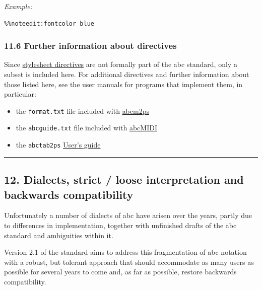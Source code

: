 \documentclass[oneside]{book}
\begin{document}
\emph{Example:}

\begin{verbatim}
%%noteedit:fontcolor blue
\end{verbatim}

\hypertarget{further_information_about_directives}{\subsubsection{11.6
Further information about
directives}\label{further_information_about_directives}}

Since \protect\hyperlink{stylesheet_directive_definition}{stylesheet
directives} are not formally part of the abc standard, only a subset is
included here. For additional directives and further information about
those listed here, see the user manuals for programs that implement
them, in particular:

\begin{itemize}
\item
  the \texttt{format.txt} file included with
  \href{http://moinejf.free.fr/}{abcm2ps}
\item
  the \texttt{abcguide.txt} file included with
  \href{http://abc.sourceforge.net/abcMIDI/}{abcMIDI}
\item
  the \texttt{abctab2ps}
  \href{http://www.lautengesellschaft.de/cdmm/userguide/userguide.html}{User's
  guide}
\end{itemize}

\begin{center}\rule{0.5\linewidth}{\linethickness}\end{center}

\hypertarget{dialects_strict_loose_interpretation_and_backwards_compatibility}{\subsection{12.
Dialects, strict / loose interpretation and backwards
compatibility}\label{dialects_strict_loose_interpretation_and_backwards_compatibility}}

Unfortunately a number of dialects of abc have arisen over the years,
partly due to differences in implementation, together with unfinished
drafts of the abc standard and ambiguities within it.

Version 2.1 of the standard aims to address this fragmentation of abc
notation with a robust, but tolerant approach that should accommodate as
many users as possible for several years to come and, as far as
possible, restore backwards compatibility.
\end{document}
